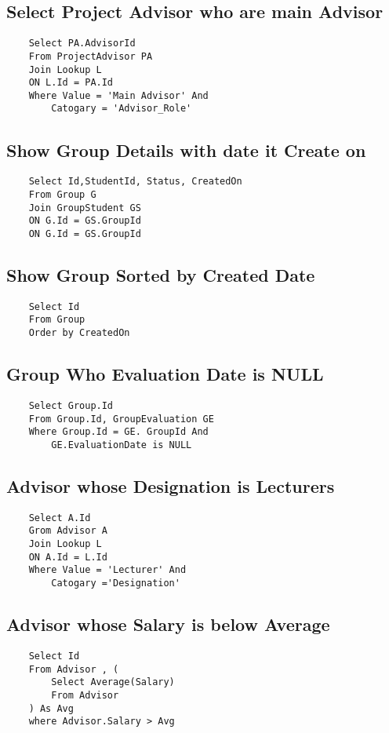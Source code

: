\documentclass{article}
\begin{document}
\subsection{Select Project Advisor who are main Advisor}
\begin{lstlisting}
    Select PA.AdvisorId
    From ProjectAdvisor PA
    Join Lookup L
    ON L.Id = PA.Id
    Where Value = 'Main Advisor' And
        Catogary = 'Advisor_Role'
\end{lstlisting}

\subsection{Show Group Details with date it Create on}
\begin{lstlisting}
    Select Id,StudentId, Status, CreatedOn
    From Group G
    Join GroupStudent GS
    ON G.Id = GS.GroupId
    ON G.Id = GS.GroupId
\end{lstlisting}


\subsection{Show Group Sorted by Created Date}
\begin{lstlisting}
    Select Id
    From Group 
    Order by CreatedOn
\end{lstlisting}


\subsection{Group Who Evaluation Date is NULL}
\begin{lstlisting}
    Select Group.Id
    From Group.Id, GroupEvaluation GE
    Where Group.Id = GE. GroupId And
        GE.EvaluationDate is NULL
\end{lstlisting}

\subsection{Advisor whose Designation is Lecturers}
\begin{lstlisting}
    Select A.Id
    Grom Advisor A
    Join Lookup L
    ON A.Id = L.Id
    Where Value = 'Lecturer' And
        Catogary ='Designation'
\end{lstlisting}


\subsection{Advisor whose Salary is below Average}
\begin{lstlisting}
    Select Id
    From Advisor , (
        Select Average(Salary)
        From Advisor
    ) As Avg
    where Advisor.Salary > Avg
\end{lstlisting}
\end{document}
